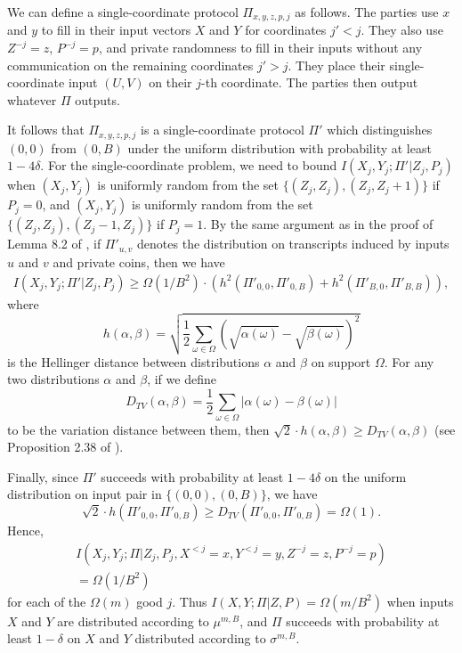 \documentclass[twoside,leqno,twocolumn]{article}
\begin{document}
We can define a single-coordinate protocol $\Pi_{x,y,z,p,j}$ as follows. 
The parties use $x$ and $y$ to fill in their input
vectors $X$ and $Y$ for coordinates $j' < j$. They also use 
$Z^{-j} = z$, $P^{-j} = p$, and private randomness to fill in their inputs without any
communication on the remaining coordinates $j' > j$. They place their
single-coordinate input $(U, V)$ on their $j$-th coordinate. The parties
then output whatever $\Pi$ outputs. 

It follows that $\Pi_{x,y,z,p,j}$ is a 
single-coordinate protocol $\Pi'$ which distinguishes
$(0,0)$ from $(0,B)$ under the uniform distribution 
with probability at least $1-4\delta$. 
For the single-coordinate problem, we need to bound
$I(X_j, Y_j ; \Pi' | Z_j, P_j)$ when $(X_j, Y_j)$ is uniformly random from 
the set $\{(Z_j, Z_j), (Z_j, Z_j+1)\}$ if $P_j = 0$, and $(X_j, Y_j)$ is uniformly
random from the set $\{(Z_j, Z_j), (Z_j-1, Z_j)\}$ if $P_j = 1$. 
By the same argument as in the proof of Lemma 8.2 of 
\cite{BJKS04}, if $\Pi'_{u,v}$ denotes the distribution on transcripts
induced by inputs $u$ and $v$ and private coins, then we have
\begin{eqnarray}\label{eqn:final}
I(X_j, Y_j ; \Pi' | Z_j, P_j)
\geq \Omega(1/B^2) \cdot (h^2(\Pi'_{0,0}, \Pi'_{0, B}) + h^2(\Pi'_{B,0},\Pi'_{B, B})),
\end{eqnarray}
where 
$$h(\alpha, \beta) = \sqrt{\frac{1}{2}\sum_{\omega \in \Omega} (\sqrt{\alpha(\omega)} - \sqrt{\beta(\omega)})^2}$$
is the Hellinger distance between distributions $\alpha$ and $\beta$ on support $\Omega$.
For any two distributions $\alpha$ and $\beta$, if we define
$$D_{TV}(\alpha, \beta) = \frac{1}{2} \sum_{\omega \in \Omega} |\alpha(\omega)-\beta(\omega)|$$
to be the variation distance between them, then $\sqrt{2} \cdot h(\alpha, \beta) \geq
D_{TV}(\alpha, \beta)$ (see Proposition 2.38 of \cite{BarYossefThesis}).
 
Finally, since $\Pi'$ 
succeeds with probability at least $1-4\delta$ on the uniform distribution
on input pair in $\{(0,0), (0,B)\}$, we have
$$\sqrt{2} \cdot h(\Pi'_{0,0},\Pi'_{0, B}) \geq D_{TV}(\Pi'_{0,0},\Pi'_{0, B}) = \Omega(1).$$
Hence,
\begin{eqnarray*}
I(X_j, Y_j ; \Pi | Z_j, P_j, X^{<j} = x, Y^{<j} = y, Z^{-j} = z, P^{-j} = p)\\
 = \Omega(1/B^2)
\end{eqnarray*}
for each of the $\Omega(m)$ good $j$.  Thus $I(X, Y ; \Pi | Z, P) =
\Omega(m/B^2)$ when inputs $X$ and $Y$ are distributed according to
$\mu^{m,B}$, and $\Pi$ succeeds with probability at least $1-\delta$
on $X$ and $Y$ distributed according to $\sigma^{m,B}$.
\end{document}
